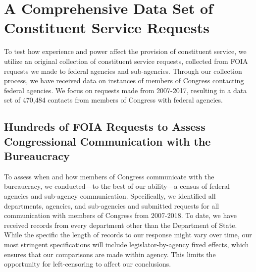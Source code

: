 \documentclass[12pt]{article}
\begin{document}
\section{A Comprehensive Data Set of Constituent Service Requests} \label{s:data}
To test how experience and power affect the provision of constituent service, we utilize an original collection of constituent service requests, collected from  FOIA requests we made to federal agencies and sub-agencies.  Through our collection process, we have received data on  instances of members of Congress contacting federal agencies.  We focus on requests made from 2007-2017, resulting in a data set of 470,484 contacts from members of Congress with federal agencies.   

\subsection{Hundreds of FOIA Requests to Assess Congressional Communication with the Bureaucracy}
To assess when and how members of Congress communicate with the bureaucracy, we conducted---to the best of our ability---a census of federal agencies and sub-agency communication.  Specifically, we identified all departments, agencies, and sub-agencies and submitted requests for all communication with members of Congress from 2007-2018.  To date, we have received records from every department other than the Department of State.  While the specific the length of records to our response might vary over time, our most stringent specifications will include legislator-by-agency fixed effects, which ensures that our comparisons are made within agency.  This limits the opportunity for left-censoring to affect our conclusions.  %
\end{document}
